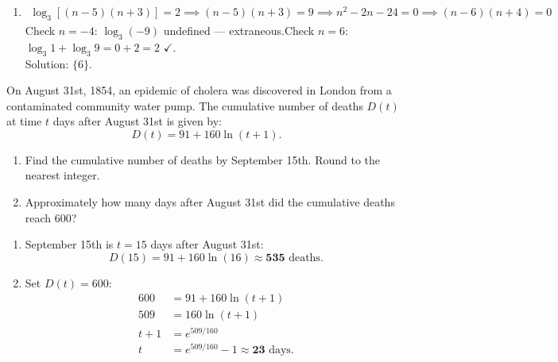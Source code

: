 \documentclass{ximera}
\begin{document}
\begin{problem}
\begin{solution}
\begin{enumerate}
  \item[(f)]
  \begin{align*}
    \log_3[(n-5)(n+3)]=2 \implies (n-5)(n+3)=9 \implies n^2-2n-24=0 \implies (n-6)(n+4)=0
  \end{align*}
  Check $n=-4$: $\log_3(-9)$ undefined — extraneous.\quad Check $n=6$: $\log_3 1+\log_3 9=0+2=2$ $\checkmark$.\\
  Solution: $\{6\}$.
\end{enumerate}
\end{solution}
\end{problem}


\begin{problem}
On August 31st, 1854, an epidemic of cholera was discovered in London from a contaminated community water pump. The cumulative number of deaths $D(t)$ at time $t$ days after August 31st is given by:
$$D(t) = 91 + 160\ln(t+1).$$
\begin{enumerate}
  \item[(a)] Find the cumulative number of deaths by September 15th. Round to the nearest integer.
  \medskip
  \item[(b)] Approximately how many days after August 31st did the cumulative deaths reach 600?
\end{enumerate}

\begin{solution}
\begin{enumerate}
  \item[(a)] September 15th is $t=15$ days after August 31st:
  $$D(15) = 91 + 160\ln(16) \approx \mathbf{535}\text{ deaths.}$$

  \item[(b)] Set $D(t)=600$:
  \begin{align*}
    600 &= 91+160\ln(t+1)\\
    509 &= 160\ln(t+1)\\
    t+1 &= e^{509/160}\\
    t &= e^{509/160}-1 \approx \mathbf{23}\text{ days.}
  \end{align*}
\end{enumerate}
\end{solution}
\end{problem}
\end{document}
